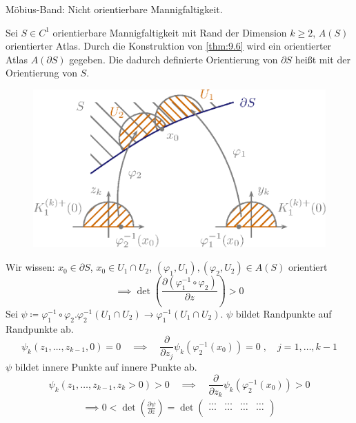 \documentclass[a4paper,10pt]{scrbook}
\begin{document}
\begin{example}
\begin{enum-arab}
    \item Möbius-Band: Nicht orientierbare Mannigfaltigkeit.
  \end{enum-arab}
\end{example}

\begin{theorem}[Definition] \label{thm:9.11}
  Sei $S \in C^1$ orientierbare Mannigfaltigkeit mit Rand der Dimension $k \geq 2$, $A(S)$ orientierter Atlas. Durch die Konstruktion von \ref{thm:9.6} wird ein orientierter Atlas $A(\partial S)$ gegeben. Die dadurch definierte Orientierung von $\partial S$ heißt   mit der Orientierung von $S$.
  \begin{figure}[H]
    \centering
    \includegraphics[scale=0.2]{images/ana3-tmp-76}
  \end{figure}
  Wir wissen: $x_0 \in \partial S$, $x_0 \in U_1 \cap U_2$, $(\varphi_1,U_1),(\varphi_2,U_2) \in A(S)$ orientiert
  \[ \implies \det \left( \frac{\partial (\varphi_1^{-1} \circ \varphi_2)}{\partial z} \right) > 0 \]
  Sei $\psi \coloneq \varphi_1^{-1} \circ \varphi_2 . \varphi_2^{-1}(U_1 \cap U_2) \to \varphi_1^{-1}(U_1 \cap U_2)$. $\psi$ bildet Randpunkte auf Randpunkte ab.
  \[ \psi_k(z_1,\ldots,z_{k-1},0) = 0 \quad \implies \quad \frac{\partial}{\partial z_j} \psi_k(\varphi_2^{-1}(x_0)) = 0 \; , \quad j=1,\ldots,k-1 \]
  $\psi$ bildet innere Punkte auf innere Punkte ab.
  \[ \psi_k(z_1,\ldots,z_{k-1},z_k>0) > 0 \quad \implies \quad \frac{\partial}{\partial z_k} \psi_k(\varphi_2^{-1}(x_0)) > 0 \]
  \begin{align*}
    \implies 0 < \det\left( \frac{\partial \psi}{\partial z} \right)= \det
    \begin{pmatrix}
    \ldots & \ldots & \ldots & \ldots \\
    \ldots & \ldots & \ldots & \ldots \\

\end{pmatrix}
\end{align*}
\end{theorem}
\end{document}
